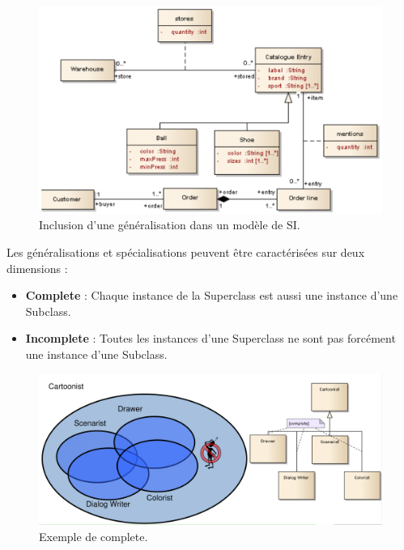 \documentclass[../Syllabus.tex]{subfiles}
\begin{document}
\begin{figure}[htp]
    \centering
    \includegraphics[width=14cm]{./img/chapter2-generalisation2.png}
    \caption{Inclusion d'une généralisation dans un modèle de SI.}
    \label{fig:chapter2-generalisation}
\end{figure}

Les généralisations et spécialisations peuvent être caractérisées sur deux dimensions :

\begin{itemize}
  \item \textbf{Complete} : Chaque instance de la Superclass est aussi une instance d'une Subclass.
  \item \textbf{Incomplete} : Toutes les instances d'une Superclass ne sont pas forcément une instance d'une Subclass.
\end{itemize}

\begin{figure}[htp]
    \centering
    \includegraphics[width=14cm]{./img/chapter2-complete.png}
    \caption{Exemple de complete.}
    \label{fig:chapter2-complete}
\end{figure}
\end{document}
